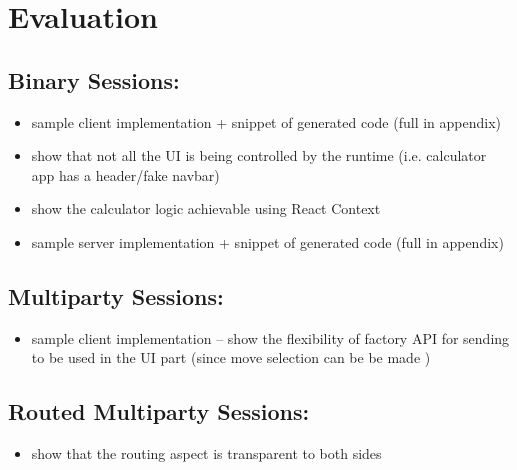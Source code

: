 \chapter{Evaluation}
\label{chap:eval}

\section{Binary Sessions: }
\begin{itemize}
\item sample client implementation + snippet of generated code (full in appendix)
\item show that not all the UI is being controlled by the runtime (i.e. calculator app has a header/fake navbar)
\item show the calculator logic achievable using React Context
\item sample server implementation + snippet of generated code (full in appendix)
\end{itemize}

\section{Multiparty Sessions: }
\begin{itemize}
\item sample client implementation -- show the flexibility of factory API for sending to be used in the UI part (since move selection can be be made )
\end{itemize}

\section{Routed Multiparty Sessions: }
\begin{itemize}
\item show that the routing aspect is transparent to both sides
\end{itemize}

